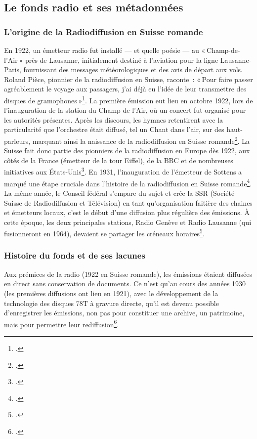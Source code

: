 \subsection{Le fonds radio et ses métadonnées}
\subsubsection{L'origine de la Radiodiffusion en Suisse romande}

En 1922, un émetteur radio fut installé — et quelle poésie — au « Champ-de-l’Air » près de Lausanne, initialement destiné à l’aviation pour la ligne Lausanne-Paris, fournissant des messages météorologiques et des avis de départ aux vols. Roland Pièce, pionnier de la radiodiffusion en Suisse, raconte : « Pour faire passer agréablement le voyage aux passagers, j’ai déjà eu l’idée de leur transmettre des disques de gramophones »\footcite{1939}. La première émission eut lieu en octobre 1922, lors de l’inauguration de la station du Champ-de-l’Air, où un concert fut organisé pour les autorités présentes. Après les discours, les hymnes retentirent avec la particularité que l’orchestre était diffusé, tel un Chant dans l’air, sur des haut-parleurs, marquant ainsi la naissance de la radiodiffusion en Suisse romande\footcite{1939}. La Suisse fait donc partie des pionniers de la radiodiffusion en Europe dès 1922, aux côtés de la France (émetteur de la tour Eiffel), de la BBC et de nombreuses initiatives aux États-Unis\footcite{2022a}. 
En 1931, l’inauguration de l’émetteur de Sottens a marqué une étape cruciale dans l’histoire de la radiodiffusion en Suisse romande\footcite{zotero-256}. La même année, le Conseil fédéral s’empare du sujet et crée la SSR (Société Suisse de Radiodiffusion et Télévision) en tant qu’organisation faitière des chaines et émetteurs locaux, c’est le début d’une diffusion plus régulière des émissions. À cette époque, les deux principales stations, Radio Genève et Radio Lausanne (qui fusionneront en 1964), devaient se partager les créneaux horaires\footcite{2022a}.

\subsubsection{Histoire du fonds et de ses lacunes}


Aux prémices de la radio (1922 en Suisse romande), les émissions étaient diffusées en direct sans conservation de documents. Ce n’est qu’au cours des années 1930 (les premières diffusions ont lieu en 1921), avec le développement de la technologie des disques 78T à gravure directe, qu’il est devenu possible d’enregistrer les émissions, non pas pour constituer une archive, un patrimoine, mais pour permettre leur rediffusion\footcite[p. 26]{prongue2009}.

